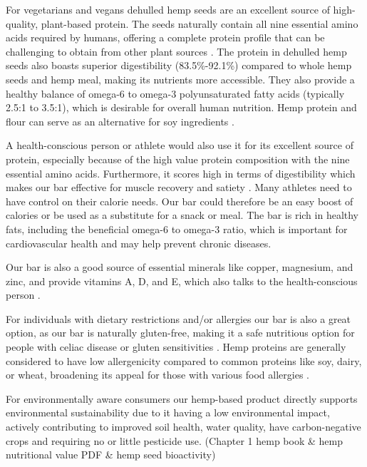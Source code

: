 \vspace{1em}
For vegetarians and vegans dehulled hemp seeds are an excellent source of high-quality, plant-based protein. The seeds naturally contain all nine essential amino acids required by humans, offering a complete protein profile that can be challenging to obtain from other plant sources \cite*{HempBook}. The protein in dehulled hemp seeds also boasts superior digestibility (83.5\%-92.1\%) compared to whole hemp seeds and hemp meal, making its nutrients more accessible. They also provide a healthy balance of omega-6 to omega-3 polyunsaturated fatty acids (typically 2.5:1 to 3.5:1), which is desirable for overall human nutrition. \cite*{montero2023hemp} Hemp protein and flour can serve as an alternative for soy ingredients \cite*{Shen2020HempseedDehulling}.

\vspace{1em}
A health-conscious person or athlete would also use it for its excellent source of protein, especially because of the high value protein composition with the nine essential amino acids. Furthermore, it scores high in terms of digestibility which makes our bar effective for muscle recovery and satiety \cite*{HempBook}. Many athletes need to have control on their calorie needs. Our bar could therefore be an easy boost of calories or be used as a substitute for a snack or meal.
\vspace{0.5em}
The bar is rich in healthy fats, including the beneficial omega-6 to omega-3 ratio, which is important for cardiovascular health and may help prevent chronic diseases. \cite*{montero2023hemp}

\vspace{1em}
Our bar is also a good source of essential minerals like copper, magnesium, and zinc, and provide vitamins A, D, and E, which also talks to the health-conscious person \cite*{HempBook}. 

\vspace{1em}
For individuals with dietary restrictions and/or allergies our bar is also a great option, as our bar is naturally gluten-free, making it a safe nutritious option for people with celiac disease or gluten sensitivities \cite*{HempBook}. Hemp proteins are generally considered to have low allergenicity compared to common proteins like soy, dairy, or wheat, broadening its appeal for those with various food allergies \cite*{HempBook,montero2023hemp,aluko2017hemp}. 

\vspace{1em}
For environmentally aware consumers our hemp-based product directly supports environmental sustainability due to it having a low environmental impact, actively contributing to improved soil health, water quality, have carbon-negative crops and requiring no or little pesticide use. (Chapter 1 hemp book \& hemp nutritional value PDF \& hemp seed bioactivity) 

